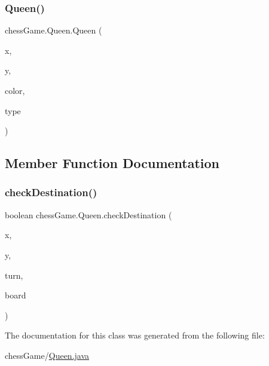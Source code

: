 \subsubsection{\texorpdfstring{Queen()}{Queen()}}
{\footnotesize\ttfamily chess\+Game.\+Queen.\+Queen (\begin{DoxyParamCaption}\item[{int}]{x,  }\item[{int}]{y,  }\item[{\hyperlink{classchess_game_1_1_piece_ad5117cbbbaebf3a27c4f3c2bcbd6678b}{color}}]{color,  }\item[{\hyperlink{classchess_game_1_1_piece_a1370c7f61581a1b72fa8ac2fd1af70a2}{type}}]{type }\end{DoxyParamCaption})}



\subsection{Member Function Documentation}
\hypertarget{classchess_game_1_1_queen_af27e38067888a18cb60dc3f9f7e2a87c}{}\label{classchess_game_1_1_queen_af27e38067888a18cb60dc3f9f7e2a87c} 
\subsubsection{\texorpdfstring{check\+Destination()}{checkDestination()}}
{\footnotesize\ttfamily boolean chess\+Game.\+Queen.\+check\+Destination (\begin{DoxyParamCaption}\item[{int}]{x,  }\item[{int}]{y,  }\item[{int}]{turn,  }\item[{\hyperlink{classchess_game_1_1_chess_board}{Chess\+Board}}]{board }\end{DoxyParamCaption})}



The documentation for this class was generated from the following file\+:\begin{DoxyCompactItemize}
\item 
chess\+Game/\hyperlink{_queen_8java}{Queen.\+java}\end{DoxyCompactItemize}
